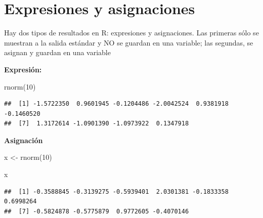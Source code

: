 \documentclass[
]{book}
\newenvironment{Shaded}{\begin{snugshade}}{\end{snugshade}}
\newcommand{\DecValTok}[1]{\textcolor[rgb]{0.00,0.00,0.81}{#1}}
\newcommand{\FunctionTok}[1]{\textcolor[rgb]{0.00,0.00,0.00}{#1}}
\newcommand{\NormalTok}[1]{#1}
\newcommand{\OtherTok}[1]{\textcolor[rgb]{0.56,0.35,0.01}{#1}}
\begin{document}
\hypertarget{expresiones-y-asignaciones}{%
\section{Expresiones y asignaciones}\label{expresiones-y-asignaciones}}

Hay dos tipos de resultados en R: expresiones y asignaciones. Las primeras sólo se muestran a la salida estándar y NO se guardan en una variable; las segundas, se asignan y guardan en una variable

\textbf{Expresión:}

\begin{Shaded}
\begin{Highlighting}[]
\FunctionTok{rnorm}\NormalTok{(}\DecValTok{10}\NormalTok{)}
\end{Highlighting}
\end{Shaded}

\begin{verbatim}
##  [1] -1.5722350  0.9601945 -0.1204486 -2.0042524  0.9381918 -0.1460520
##  [7]  1.3172614 -1.0901390 -1.0973922  0.1347918
\end{verbatim}

\textbf{Asignación}

\begin{Shaded}
\begin{Highlighting}[]
\NormalTok{x }\OtherTok{\textless{}{-}} \FunctionTok{rnorm}\NormalTok{(}\DecValTok{10}\NormalTok{)}
\end{Highlighting}
\end{Shaded}

\begin{Shaded}
\begin{Highlighting}[]
\NormalTok{x}
\end{Highlighting}
\end{Shaded}

\begin{verbatim}
##  [1] -0.3588845 -0.3139275 -0.5939401  2.0301381 -0.1833358  0.6998264
##  [7] -0.5824878 -0.5775879  0.9772605 -0.4070146
\end{verbatim}
\end{document}
